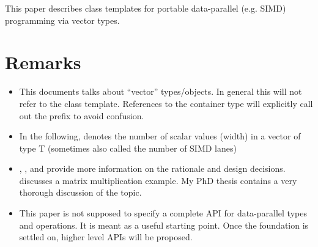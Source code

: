 \newcommand\specialsfinae{shall not participate in overload resolution\comment{“shall either not be declared or not participate in overload resolution”? impl. via base class or concepts}\xspace}

\newcommand\realArithmeticType{vectorizable type\xspace}

\usepackage{pifont}

\newcommand\foralli[1][]{for all \code i $\in$ \code{[0, #1size())}\xspace}
\newcommand\forallmaskedi[2][]{%
  for all \code i
  $\in \{j \in \mathbb{N}_0 | j < \code{#1size()} ⋀ \code{#2[}j\code{]}\}$%
  \xspace%
}
\newcommand\chck{\item[\color{black}\ensuremath{\checkmark}]}
\newcommand\todo{\item[\color{black}\ding{46}] \color{gray}}
\newcommand\itemheader[1]{\item[] \hfill \textcolor{gray}{\textsc{#1}}}


\begin{wgTitlepage}
  This paper describes class templates for portable data-parallel (e.g. SIMD) programming via vector types.
\end{wgTitlepage}

\pagestyle{scrheadings}
\addtocounter{section}{-1}
\section{Remarks}
\begin{itemize}
  \item This documents talks about “vector” types/objects.
    In general this will not refer to the \std{} class template.
    References to the container type will explicitly call out the  prefix to avoid confusion.
  \item In the following,  denotes the number of scalar values (width) in a vector of type \type T (sometimes also called the number of SIMD lanes)
  \item \parencite{N4184}, \parencite{N4185}, and \parencite{N4395} provide more information on the rationale and design decisions.
    \parencite{N4454} discusses a matrix multiplication example.
    My PhD thesis \parencite{Kretz2015} contains a very thorough discussion of the topic.
  \item This paper is not supposed to specify a complete API for data-parallel types and operations.
    It is meant as a useful starting point.
    Once the foundation is settled on, higher level APIs will be proposed.
\end{itemize}

